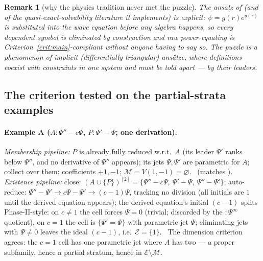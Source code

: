 \documentclass[11pt]{article}
\newcommand{\Psib}{\Psi}
\newcommand{\Mem}{\mathcal{M}}
\newcommand{\Ex}{\mathcal{E}}
\newtheorem{remark}{Remark}
\begin{document}
\begin{remark}[why the physics tradition never met the puzzle]
The ansatz of \cite{chaharbashloo} (and of the quasi-exact-solvability
literature it implements) is \emph{explicit}: $\psi = g(r)e^{y(r)}$ is
substituted into the wave equation before any algebra happens, so every
dependent symbol is eliminated by construction and raw power-equating is
Criterion~\ref{crit:main}-compliant without anyone having to say so. The
puzzle is a phenomenon of \emph{implicit} (differentially triangular)
ans\"atze, where definitions coexist with constraints in one system and
must be told apart --- by their leaders.
\end{remark}

\subsection{The criterion tested on the partial-strata examples}
\label{sec:tests}

\paragraph{Example A ($A: \Psib''-c\Psib$, $P: \Psib'-\Psib$; one derivation).}
\emph{Membership pipeline:} $P$ is already fully reduced w.r.t.\ $A$ (its
leader $\Psib'$ ranks below $\Psib''$, and no derivative of $\Psib''$
appears); its jets $\Psib,\Psib'$ are parametric for $A$; collect over them:
coefficients $+1, -1$; $\Mem = V(1,-1) = \varnothing$. \checkmark\ (matches
\cite[Ex.~1]{membership-note}).
\emph{Existence pipeline:} close: $(A\cup\{P\})^{[2]} =
\{\Psib''-c\Psib,\ \Psib'-\Psib,\ \Psib''-\Psib'\}$; auto-reduce:
$\Psib''-\Psib' \to c\Psib - \Psib' \to (c-1)\Psib$, tracking no division
(all initials are $1$ until the derived equation appears); the derived
equation's initial $(c-1)$ splits Phase-II-style: on $c \ne 1$ the cell
forces $\Psib = 0$ (trivial; discarded by the $:\Psib^\infty$ quotient), on
$c = 1$ the cell is $\{\Psib' = \Psib\}$ with parametric jet $\Psib$;
eliminating jets with $\Psib \ne 0$ leaves the ideal $(c-1)$, i.e.\
$\Ex = \{1\}$. \checkmark\ The dimension criterion agrees: the $c=1$ cell has
one parametric jet where $A$ has two --- a proper subfamily, hence a partial
stratum, hence in $\Ex \setminus \Mem$.
\end{document}
